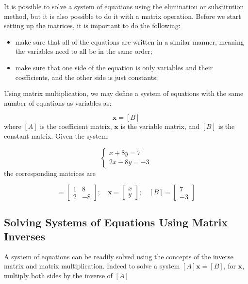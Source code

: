 It is possible to solve a system of equations using the elimination or substitution method, but it is also possible to do it with a matrix
operation. Before we start setting up the matrices, it is important to do the following:

\begin{itemize}
\tightlist
\item make sure that all of the equations are written in a similar manner, meaning the variables need to all be in the same order;
\item make sure that one side of the equation is only variables and their coefficients, and the other side is just constants;
\end{itemize}

Using matrix multiplication, we may define a system of equations with the same number of equations as variables as:

\begin{equation} 
[A]\boldsymbol{x} = [B]
\end{equation}
where $[A]$ is the coefficient matrix, $\boldsymbol{x}$ is the variable matrix, and $[B]$ is the constant matrix. Given the system:

\begin{equation*}
\begin{cases}
x + 8y = 7 \\
2x -8y = -3
\end{cases}
\end{equation*}
the corresponding matrices are

\begin{equation*}
[A]=
\begin{bmatrix}
1 & 8\\
2 & -8
\end{bmatrix}
;\quad
\boldsymbol{x}=
\begin{bmatrix}
x\\
y
\end{bmatrix}
;\quad
[B]=
\begin{bmatrix}
7\\
-3
\end{bmatrix}
\end{equation*}

\subsection{Solving Systems of Equations Using Matrix Inverses}
\label{solving-systems-of-equations-using-matrix-inverses}

A system of equations can be readily solved using the concepts of the inverse matrix and matrix multiplication. Indeed to solve a system $[A]\boldsymbol{x}=[B]$, for $\boldsymbol{x}$, multiply both sides by the inverse of $[A]$

